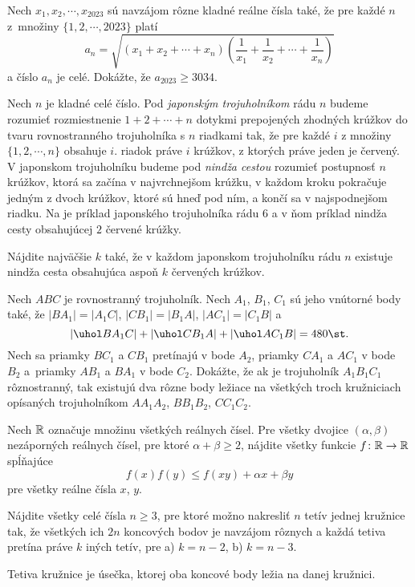 {%
Nech $x_1, x_2, \cdots, x_{2023}$ sú navzájom rôzne kladné reálne čísla také, že pre každé $n$ z~množiny $\{1,2,\cdots,2023\}$ platí
$$
a_n=\sqrt{(x_1+x_2+\cdots+x_n)\left(\frac1{x_1}+\frac1{x_2}+\cdots+\frac1{x_n}\right)}
$$
a číslo $a_n$ je celé. Dokážte, že $a_{2023}\ge3034$.
}

{%
Nech $n$ je kladné celé číslo. Pod \emph{japonským trojuholníkom} rádu $n$ budeme rozumieť rozmiestnenie $1+2+\cdots+n$ dotykmi prepojených zhodných krúžkov do tvaru rovnostranného trojuholníka s $n$ riadkami tak, že pre každé $i$ z množiny $\{1,2,\cdots,n\}$ obsahuje $i$. riadok práve $i$ krúžkov,
z ktorých práve jeden je červený. V japonskom trojuholníku budeme pod \emph{nindža cestou} rozumieť postupnosť $n$ krúžkov, ktorá sa začína v najvrchnejšom krúžku, v každom kroku pokračuje jedným z dvoch krúžkov, ktoré sú hneď pod ním, a končí sa v najspodnejšom riadku. Na \obr{} je príklad japonského trojuholníka rádu $6$ a v ňom príklad nindža cesty obsahujúcej $2$ červené krúžky.
%

Nájdite najväčšie $k$ také, že v každom japonskom trojuholníku rádu $n$ existuje nindža cesta obsahujúca aspoň $k$ červených krúžkov.
}

{%
Nech $ABC$ je rovnostranný trojuholník. Nech $A_1$, $B_1$, $C_1$ sú jeho vnútorné body také, že $|BA_1|=|A_1C|$, $|CB_1|=|B_1A|$, $|AC_1|=|C_1B|$
a
$$
|\uhol BA_1C| + |\uhol CB_1A| +|\uhol AC_1B| = 480\st.
$$
Nech sa priamky $BC_1$ a $CB_1$ pretínajú v bode $A_2$, priamky $CA_1$ a $AC_1$ v bode $B_2$ a~priamky $AB_1$ a $BA_1$ v bode $C_2$. Dokážte, že ak je trojuholník $A_1B_1C_1$ rôznostranný, tak existujú dva rôzne body ležiace na všetkých troch kružniciach opísaných trojuholníkom $AA_1A_2$, $BB_1B_2$, $CC_1C_2$.
}

{%
Nech $\Bbb R$ označuje množinu všetkých reálnych čísel. Pre všetky dvojice $(\alpha, \beta)$  nezáporných reálnych čísel, pre ktoré $\alpha+\beta\ge2$, nájdite všetky funkcie $f\colon \Bbb R \to \Bbb R$ spĺňajúce $$f(x)f(y)\le f(xy)+\alpha x+\beta y$$ pre všetky reálne čísla $x$, $y$.}

{%
Nájdite všetky celé čísla $n\ge 3$, pre ktoré možno nakresliť $n$ tetív jednej kružnice tak, že všetkých ich $2n$ koncových bodov je navzájom rôznych a každá tetiva pretína práve $k$ iných tetív, pre
\ite a) $k=n-2$,
\ite b) $k=n-3$.

\poznamka
Tetiva kružnice je úsečka, ktorej oba koncové body ležia na danej kružnici.}

